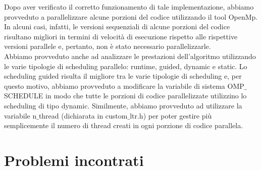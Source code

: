Dopo aver verificato il corretto funzionamento di tale implementazione, abbiamo provveduto a parallelizzare alcune porzioni del codice utilizzando il tool OpenMp. In alcuni casi, infatti, le versioni sequenziali di alcune porzioni del codice risultano migliori in termini di velocità di esecuzione rispetto alle rispettive versioni parallele e, pertanto, non è stato necessario parallelizzarle.\\ Abbiamo provveduto anche ad analizzare le prestazioni dell'algoritmo utilizzando le varie tipologie di scheduling parallelo: runtime, guided, dynamic e static. Lo scheduling guided risulta il migliore tra le varie tipologie di scheduling e, per questo motivo, abbiamo provveduto a modificare la variabile di sistema OMP$\_$SCHEDULE in modo che tutte le porzioni di codice parallelizzate utilizzino lo scheduling di tipo dynamic. Similmente, abbiamo provveduto ad utilizzare la variabile n$\_$thread (dichiarata in custom$\_$ltr.h) per poter gestire più semplicemente il numero di thread creati in ogni porzione di codice parallela.

	\section*{Problemi incontrati}

